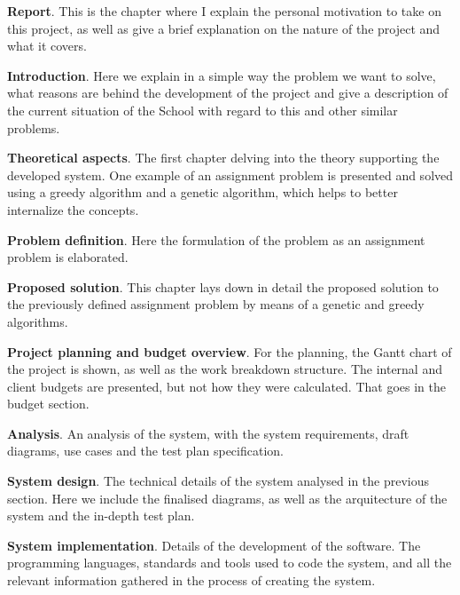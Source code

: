 \begin{description}

    \item \textbf{Report}. This is the chapter where I explain the personal motivation to take on this project, as well as give a brief explanation on the nature of the project and what it covers. 

    \item \textbf{Introduction}. Here we explain in a simple way the problem we want to solve, what reasons are behind the development of the project and give a description of the current situation of the School with regard to this and other similar problems.

    \item \textbf{Theoretical aspects}. The first chapter delving into the theory supporting the developed system. One example of an assignment problem is presented and solved using a greedy algorithm and a genetic algorithm, which helps to better internalize the concepts.

    \item \textbf{Problem definition}. Here the formulation of the problem as an assignment problem is elaborated. 

    \item \textbf{Proposed solution}. This chapter lays down in detail the proposed solution to the previously defined assignment problem by means of a genetic and greedy algorithms.

    \item \textbf{Project planning and budget overview}. For the planning, the Gantt chart of the project is shown, as well as the work breakdown structure. The internal and client budgets are presented, but not how they were calculated. That goes in the budget section.

    \item \textbf{Analysis}. An analysis of the system, with the system requirements, draft diagrams, use cases and the test plan specification. 

    \item \textbf{System design}. The technical details of the system analysed in the previous section. Here we include the finalised diagrams, as well as the arquitecture of the system and the in-depth test plan.

    \item \textbf{System implementation}. Details of the development of the software. The programming languages, standards and tools used to code the system, and all the relevant information gathered in the process of creating the system.


\end{description}
